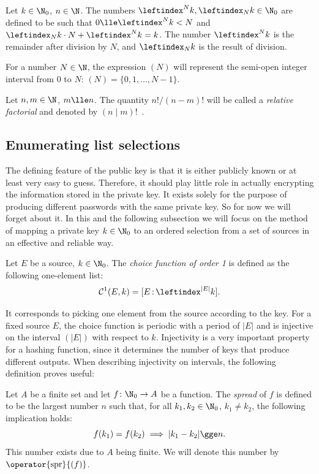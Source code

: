 \documentclass[12pt, a4paper]{article}
\renewcommand{\C}{\mathcal{C}}
\newcommand{\spr}[1]{\operator{\mathrm{spr}}{(#1)}}
\newcommand{\lli}[1]{\leftindex_{#1}}
\newcommand{\lui}[1]{\leftindex^{#1}}
\newcommand{\elt}{\mathop{:}}
\begin{document}
Let $ k \in \N_0 $, $ n \in \N $. The numbers $ \lui{N}k, \lli{N}k \in \N_0 $ are defined to be such that $ 0 \lle \lui{N}k < N $ and $ \lli{N}k \cdot N + \lui{N}k = k $. The number $ \lui{N}k $ is the remainder after division by $ N $, and $ \lli{N}k $ is the result of division.

For a number $ N \in \N $, the expression $ (N) $ will represent the semi-open integer interval from 0 to $ N $: $ (N) = \{0, 1, ..., N-1\} $.

Let $ n, m \in \N $, $ m \lle n $. The quantity $ n!/(n-m)! $ will be called a \emph{relative factorial} and denoted by $ (n \mid m)! $\ .

\subsection{Enumerating list selections}

The defining feature of the public key is that it is either publicly known or at least very easy to guess. Therefore, it should play little role in actually encrypting the information stored in the private key. It exists solely for the purpose of producing different passwords with the same private key. So for now we will forget about it. In this and the following subsection we will focus on the method of mapping a private key $ k \in \N_0 $ to an ordered selection from a set of sources in an effective and reliable way.

\begin{definition}
    Let $ E $ be a source, $ k \in \N_0 $. The \emph{choice function of order 1} is defined as the following one-element list:
    \[ \C^1(E, k) = [E \elt \lui{|E|}k]. \]
\end{definition}

It corresponds to picking one element from the source according to the key. For a fixed source $ E $, the choice function is periodic with a period of $ |E| $ and is injective  on the interval $ (|E|) $ with respect to $ k $. Injectivity is a very important property for a hashing function, since it determines the number of keys that produce different outputs. When describing injectivity on intervals, the following definition proves useful:

\begin{definition}
    Let $ A $ be a finite set and let $ f \colon \N_0 \to A $ be a function. The \emph{spread} of $ f $ is defined to be the largest number $ n $ such that, for all $ k_1, k_2 \in \N_0 $, $ k_1 \ne k_2 $, the following implication holds:
    \[ f(k_1) = f(k_2) \implies |k_1 - k_2| \gge n. \]
    This number exists due to $ A $ being finite. We will denote this number by $ \spr{f} $.
\end{definition}
\end{document}
